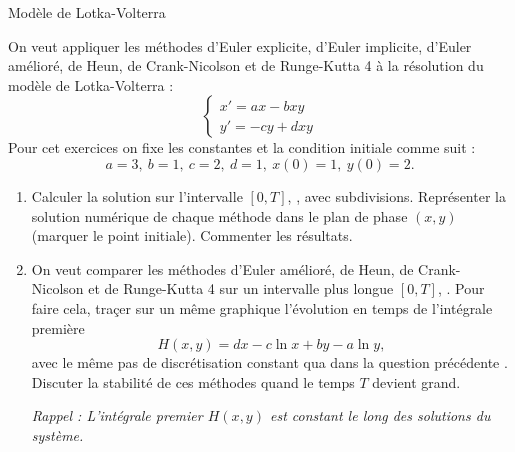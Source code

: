 \documentclass[a4paper,12pt,reqno]{amsart}
\begin{document}
\begin{exo} Modèle de Lotka-Volterra

  On veut appliquer les méthodes d'Euler explicite, d'Euler implicite, d'Euler amélioré, de Heun, de Crank-Nicolson et de Runge-Kutta 4
  à la résolution du modèle de Lotka-Volterra :
    $$
      \begin{cases}
        x' =ax-bxy\\
        y' =-cy+dxy
      \end{cases}
    $$
  Pour cet exercices on fixe les constantes et la condition initiale comme suit :
    $$
    a=3,\ b=1,\ c=2,\ d=1,\ x(0)=1,\ y(0)=2.
    $$
  \begin{enumerate}
    \item Calculer la solution sur l'intervalle $[0,T]$, , avec  subdivisions. Représenter la solution numérique de chaque méthode dans le plan de phase $(x,y)$ (marquer le point initiale). Commenter les résultats.
    \item On veut comparer les méthodes d'Euler amélioré, de Heun, de Crank-Nicolson et de Runge-Kutta 4 sur un intervalle plus longue $[0,T]$, . Pour faire cela, traçer sur un même graphique l'évolution en temps de l'intégrale première
      $$
        H(x,y) = dx -c \ln x + by -a \ln y,
      $$
    avec le même pas de discrétisation constant qua dans la question précédente . Discuter la stabilité de ces méthodes quand le temps $T$ devient grand.

    \textit{Rappel : L'intégrale premier $H(x,y)$ est constant le long des solutions du système.}
  \end{enumerate}
\end{exo}
\end{document}
